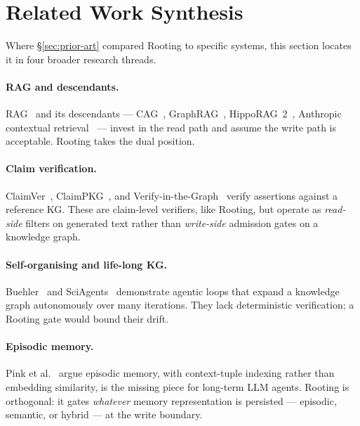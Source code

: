 \documentclass[10pt,a4paper]{article}
\begin{document}
\section{Related Work Synthesis}
\label{sec:related}

Where \S\ref{sec:prior-art} compared Rooting to specific systems,
this section locates it in four broader research threads.

\paragraph{RAG and descendants.}
\begin{sloppypar}
RAG~\cite{lewis2020rag} and its descendants
--- CAG~\cite{chan2024cag}, GraphRAG~\cite{edge2024graphrag},
HippoRAG~2~\cite{gutierrez2025hipporag2}, Anthropic contextual
retrieval~\cite{anthropic2024contextual} --- invest in the read path
and assume the write path is acceptable. Rooting takes the dual
position.
\end{sloppypar}

\paragraph{Claim verification.}
ClaimVer~\cite{claimver2024}, ClaimPKG~\cite{claimpkg2025}, and
Verify-in-the-Graph~\cite{verifyingraph2025} verify assertions against a
reference KG. These are claim-level verifiers, like Rooting, but operate as
\emph{read-side} filters on generated text rather than \emph{write-side}
admission gates on a knowledge graph.

\paragraph{Self-organising and life-long KG.}
Buehler~\cite{buehler2025agentic} and SciAgents~\cite{sciagents2024}
demonstrate agentic loops that expand a knowledge graph autonomously over
many iterations. They lack deterministic verification; a Rooting gate would
bound their drift.

\paragraph{Episodic memory.}
Pink et al.~\cite{pink2025episodic} argue episodic memory, with
context-tuple indexing rather than embedding similarity, is the missing
piece for long-term LLM agents. Rooting is orthogonal: it gates
\emph{whatever} memory representation is persisted --- episodic, semantic,
or hybrid --- at the write boundary.
\end{document}
